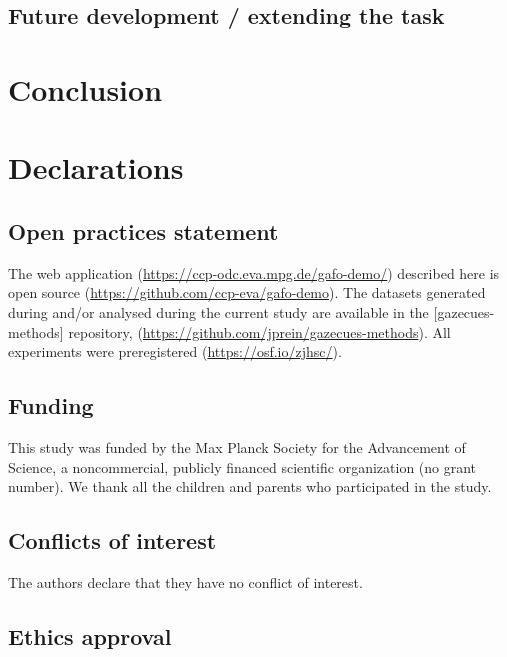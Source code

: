 \documentclass[
  man,floatsintext]{apa6}
\begin{document}
\hypertarget{future-development-extending-the-task}{%
\subsection{Future development / extending the task}\label{future-development-extending-the-task}}

\hypertarget{conclusion}{%
\section{Conclusion}\label{conclusion}}

\hypertarget{declarations}{%
\section{Declarations}\label{declarations}}

\hypertarget{open-practices-statement}{%
\subsection{Open practices statement}\label{open-practices-statement}}

The web application (\url{https://ccp-odc.eva.mpg.de/gafo-demo/}) described here is open source (\url{https://github.com/ccp-eva/gafo-demo}).
The datasets generated during and/or analysed during the current study are available in the {[}gazecues-methods{]} repository, (\url{https://github.com/jprein/gazecues-methods}). All experiments were preregistered (\url{https://osf.io/zjhsc/}).

\hypertarget{funding}{%
\subsection{Funding}\label{funding}}

This study was funded by the Max Planck Society for the Advancement of Science, a noncommercial, publicly financed scientific organization (no grant number). We thank all the children and parents who participated in the study.

\hypertarget{conflicts-of-interest}{%
\subsection{Conflicts of interest}\label{conflicts-of-interest}}

The authors declare that they have no conflict of interest.

\hypertarget{ethics-approval}{%
\subsection{Ethics approval}\label{ethics-approval}}
\end{document}
